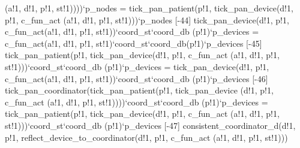                                              (a!1,
                                              d!1,
                                              p!1,
                                              st!1))))`p_nodes
       =
       tick_pan_patient(p!1,
                        tick_pan_device(d!1,
                                        p!1,
                                        c_fun_act
                                        (a!1, d!1, p!1, st!1)))`p_nodes
[-44]   tick_pan_device(d!1, p!1,
                      c_fun_act(a!1, d!1, p!1, st!1))`coord_st`coord_db
          (p!1)`p_devices
       = c_fun_act(a!1, d!1, p!1, st!1)`coord_st`coord_db(p!1)`p_devices
[-45]   tick_pan_patient(p!1,
                       tick_pan_device(d!1,
                                       p!1,
                                       c_fun_act
                                       (a!1,
                                        d!1,
                                        p!1,
                                        st!1)))`coord_st`coord_db
          (p!1)`p_devices
       =
       tick_pan_device(d!1, p!1,
                       c_fun_act(a!1, d!1, p!1, st!1))`coord_st`coord_db
           (p!1)`p_devices
[-46]   tick_pan_coordinator(tick_pan_patient(p!1,
                                            tick_pan_device
                                            (d!1,
                                             p!1,
                                             c_fun_act
                                             (a!1,
                                              d!1,
                                              p!1,
                                              st!1))))`coord_st`coord_db
          (p!1)`p_devices
       =
       tick_pan_patient(p!1,
                        tick_pan_device(d!1,
                                        p!1,
                                        c_fun_act
                                        (a!1,
                                         d!1,
                                         p!1,
                                         st!1)))`coord_st`coord_db
           (p!1)`p_devices
[-47]   consistent_coordinator_d(d!1, p!1,
                               reflect_device_to_coordinator(d!1,
                                                             p!1,
                                                             c_fun_act
                                                             (a!1,
                                                              d!1,
                                                              p!1,
                                                              st!1)))
